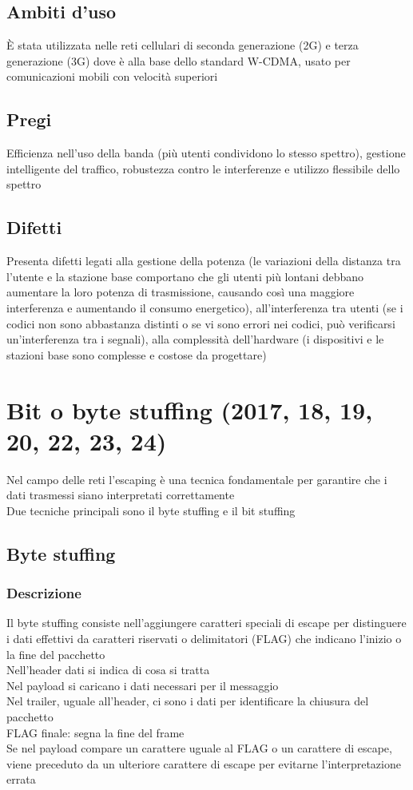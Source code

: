\documentclass[10pt,oneside,a4paper]{article}
\begin{document}
\subsection{Ambiti d'uso}
È stata utilizzata nelle reti cellulari di seconda generazione (2G) e terza generazione (3G) dove è alla base dello standard W-CDMA, usato per comunicazioni mobili con velocità superiori
\subsection{Pregi}
Efficienza nell'uso della banda (più utenti condividono lo stesso spettro), gestione intelligente del traffico, robustezza contro le interferenze e utilizzo flessibile dello spettro
\subsection{Difetti}
Presenta difetti legati alla gestione della potenza (le variazioni della distanza tra l'utente e la stazione base comportano che gli utenti più lontani debbano aumentare la loro potenza di trasmissione, causando così una maggiore interferenza e aumentando il consumo energetico), all'interferenza tra utenti (se i codici non sono abbastanza distinti o se vi sono errori nei codici, può verificarsi un'interferenza tra i segnali), alla complessità dell'hardware (i dispositivi e le stazioni base sono complesse e costose da progettare)
\section{Bit o byte stuffing (2017, 18, 19, 20, 22, 23, 24)}
Nel campo delle reti l'escaping è una tecnica fondamentale per garantire che i dati trasmessi siano interpretati correttamente\\
Due tecniche principali sono il byte stuffing e il bit stuffing
\subsection{Byte stuffing}
\subsubsection{Descrizione}
Il byte stuffing consiste nell'aggiungere caratteri speciali di escape per distinguere i dati effettivi da caratteri riservati o delimitatori (FLAG) che indicano l'inizio o la fine del pacchetto\\
Nell'header dati si indica di cosa si tratta\\
Nel payload si caricano i dati necessari per il messaggio\\
Nel trailer, uguale all'header, ci sono i dati per identificare la chiusura del pacchetto\\
FLAG finale: segna la fine del frame\\
Se nel payload compare un carattere uguale al FLAG o un carattere di escape, viene preceduto da un ulteriore carattere di escape per evitarne l'interpretazione errata
\end{document}
